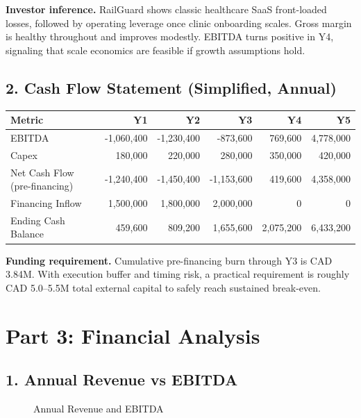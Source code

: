 \documentclass[11pt]{article}
\begin{document}
\noindent\textbf{Investor inference.} RailGuard shows classic healthcare SaaS front-loaded losses, followed by operating leverage once clinic onboarding scales. Gross margin is healthy throughout and improves modestly. EBITDA turns positive in Y4, signaling that scale economics are feasible if growth assumptions hold.

\subsection*{2. Cash Flow Statement (Simplified, Annual)}
\begin{center}
\begin{tabular}{lrrrrr}
\toprule
\textbf{Metric} & \textbf{Y1} & \textbf{Y2} & \textbf{Y3} & \textbf{Y4} & \textbf{Y5} \\
\midrule
EBITDA & -1,060,400 & -1,230,400 & -873,600 & 769,600 & 4,778,000 \\
Capex & 180,000 & 220,000 & 280,000 & 350,000 & 420,000 \\
Net Cash Flow (pre-financing) & -1,240,400 & -1,450,400 & -1,153,600 & 419,600 & 4,358,000 \\
Financing Inflow & 1,500,000 & 1,800,000 & 2,000,000 & 0 & 0 \\
Ending Cash Balance & 459,600 & 809,200 & 1,655,600 & 2,075,200 & 6,433,200 \\
\bottomrule
\end{tabular}
\end{center}

\noindent\textbf{Funding requirement.} Cumulative pre-financing burn through Y3 is CAD 3.84M. With execution buffer and timing risk, a practical requirement is roughly CAD 5.0--5.5M total external capital to safely reach sustained break-even.

\section*{Part 3: Financial Analysis}
\subsection*{1. Annual Revenue vs EBITDA}
\begin{figure}[h]
\centering
{}
\caption{Annual Revenue and EBITDA}
\end{figure}
\end{document}
